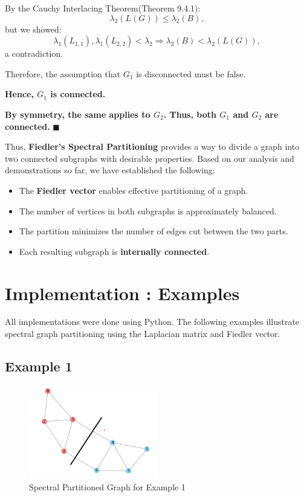 \documentclass[hidelinks,12pt]{article}
\begin{document}
\noindent By the Cauchy Interlacing Theorem(Theorem 9.4.1):
\[
\lambda_2(L(G)) \le \lambda_2(B),
\]
but we showed:
\[
\lambda_1(L_{1,1}), \lambda_1(L_{2,2}) < \lambda_2 \Rightarrow \lambda_2(B) < \lambda_2(L(G)),
\]
a contradiction.

\noindent Therefore, the assumption that $G_1$ is disconnected must be false.

\bigskip
\noindent\textbf{Hence, $G_1$ is connected.}

\noindent\textbf{By symmetry, the same applies to $G_2$. Thus, both $G_1$ and $G_2$ are connected.}
\hfill \(\blacksquare\)

\vspace{8mm}
\noindent Thus, \textbf{Fiedler’s Spectral Partitioning} provides a way to divide a graph into two connected subgraphs with desirable properties. Based on our analysis and demonstrations so far, we have established the following:

\begin{itemize}
  \item The \textbf{Fiedler vector} enables effective partitioning of a graph.
  \item The number of vertices in both subgraphs is approximately balanced.
  \item The partition minimizes the number of edges cut between the two parts.
  \item Each resulting subgraph is \textbf{internally connected}.
\end{itemize}

\newpage
\section{Implementation : Examples}

All implementations were done using Python. The following examples illustrate spectral graph partitioning using the Laplacian matrix and Fiedler vector.

\subsection*{Example 1}

\begin{figure}[h!]
\centering
\includegraphics[width=0.5\textwidth]{figures/image06.png}
\caption{Spectral Partitioned Graph for Example 1}
\end{figure}
\end{document}
